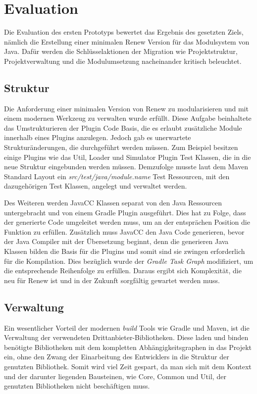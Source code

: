 \newpage
\section{Evaluation}
	Die Evaluation des ersten Prototyps bewertet das Ergebnis des gesetzten Ziels, nämlich die Erstellung einer minimalen Renew Version für das Modulsystem von Java. Dafür werden die Schlüsselaktionen der Migration wie Projektstruktur, Projektverwaltung und die Modulumsetzung nacheinander kritisch beleuchtet.

\subsection{Struktur} \label{sub:struktur}
	Die Anforderung einer minimalen Version von Renew zu modularisieren und mit einem modernen Werkzeug zu verwalten wurde erfüllt. Diese Aufgabe beinhaltete das Umstrukturieren der Plugin Code Basis, die es erlaubt zusätzliche Module innerhalb eines Plugins anzulegen. Jedoch gab es unerwartete Strukturänderungen, die durchgeführt werden müssen. Zum Beispiel besitzen einige Plugins wie das Util, Loader und Simulator Plugin Test Klassen, die in die neue Struktur eingebunden werden müssen. Demzufolge musste laut dem Maven Standard Layout ein \textit{src/test/java/module.name} Test Ressourcen, mit den dazugehörigen Test Klassen, angelegt und verwaltet werden. \newline

	Des Weiteren werden JavaCC Klassen separat von den Java Ressourcen untergebracht und von einem Gradle Plugin ausgeführt. Dies hat zu Folge, dass der generierte Code umgeleitet werden muss, um an der entsprächen Position die Funktion zu erfüllen. Zusätzlich muss JavaCC den Java Code generieren, bevor der Java Compiler mit der Übersetzung beginnt, denn die generieren Java Klassen bilden die Basis für die Plugins und somit sind sie zwingen erforderlich für die Kompilation. Dies bezüglich wurde der \textit{Gradle Task Graph} modifiziert, um die entsprechende Reihenfolge zu erfüllen. Daraus ergibt sich Komplexität, die neu für Renew ist und in der Zukunft sorgfältig gewartet werden muss. \bigbreak

\subsection{Verwaltung} \label{sub:verwaltung}
	Ein wesentlicher Vorteil der modernen \textit{build} Tools wie Gradle und Maven, ist die Verwaltung der verwendeten Drittanbieter-Bibliotheken. Diese laden und binden benötigte Bibliotheken mit dem kompletten Abhängigkeitsgraphen in das Projekt ein, ohne den Zwang der Einarbeitung des Entwicklers in die Struktur der genutzten Bibliothek. Somit wird viel Zeit gespart, da man sich mit dem Kontext und der darunter liegenden Bausteinen, wie Core, Common und Util, der genutzten Bibliotheken nicht beschäftigen muss. \newline

